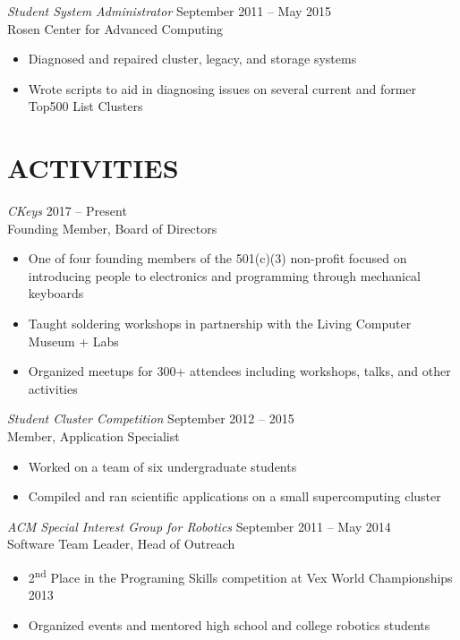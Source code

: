 \documentclass[line,margin]{res}
\begin{document}
\begin{resume}
    {\sl Student System Administrator\/} \hfill September 2011 -- May 2015 \\%
      Rosen Center for Advanced Computing
      \begin{itemize}
	\setlength{\itemsep}{-2pt}
        \item Diagnosed and repaired cluster, legacy, and storage systems
        \item Wrote scripts to aid in diagnosing issues on several current and former Top500 List Clusters
      \end{itemize}

  \section{\textcolor{TealBlue}{ACTIVITIES}}
    {\sl CKeys\/} \hfill 2017 -- Present \\%
      Founding Member, Board of Directors
      \begin{itemize}
	\setlength{\itemsep}{-2pt}
        \item One of four founding members of the 501(c)(3) non-profit focused on introducing people to electronics and programming through mechanical keyboards %
        \item Taught soldering workshops in partnership with the Living Computer Museum + Labs
        \item Organized meetups for 300+ attendees including workshops, talks, and other activities
      \end{itemize}

    {\sl Student Cluster Competition\/} \hfill September 2012 -- 2015 \\%
      Member, Application Specialist
      \begin{itemize}
	\setlength{\itemsep}{-2pt}
        \item Worked on a team of six undergraduate students
        \item Compiled and ran scientific applications on a small supercomputing cluster
      \end{itemize}
  
    {\sl ACM Special Interest Group for Robotics\/} \hfill September 2011 -- May 2014 \\%
      Software Team Leader, Head of Outreach
      \begin{itemize}
	\setlength{\itemsep}{-2pt}
        \item 2\textsuperscript{nd} Place in the Programing Skills competition at Vex World Championships 2013
        \item Organized events and mentored high school and college robotics students
      \end{itemize}
    

\end{resume}
\end{document}
